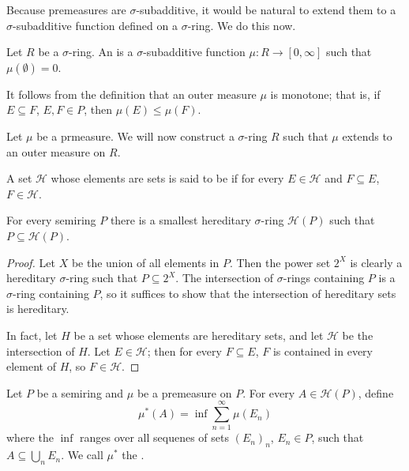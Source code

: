 \begin{subsec}
Because premeasures are $\sigma$-subadditive, it would be natural to extend them to a $\sigma$-subadditive function defined on a $\sigma$-ring. We do this now.
\end{subsec}

\begin{definition}
Let $R$ be a $\sigma$-ring.
An  is a $\sigma$-subadditive function $\mu: R \to [0, \infty]$ such that $\mu(\emptyset) = 0$.
\end{definition}

\begin{subsec}
It follows from the definition that an outer measure $\mu$ is monotone; that is, if $E \subseteq F$, $E,F \in P$, then $\mu(E) \leq \mu(F)$.
\end{subsec}

\begin{subsec}
Let $\mu$ be a prmeasure.
We will now construct a $\sigma$-ring $R$ such that $\mu$ extends to an outer measure on $R$.
\end{subsec}

\begin{definition}
A set $\mathcal H$ whose elements are sets is said to be  if for every $E \in \mathcal H$ and $F \subseteq E$, $F \in \mathcal H$.
\end{definition}

\begin{lemma}
For every semiring $P$ there is a smallest hereditary $\sigma$-ring $\mathcal H(P)$ such that $P \subseteq \mathcal H(P)$.
\end{lemma}
\begin{proof}
Let $X$ be the union of all elements in $P$. Then the power set $2^{X}$ is clearly a hereditary $\sigma$-ring such that $P \subseteq 2^{X}$.
The intersection of $\sigma$-rings containing $P$ is a $\sigma$-ring containing $P$, so it suffices to show that the intersection of hereditary sets is hereditary.

In fact, let $H$ be a set whose elements are hereditary sets, and let $\mathcal H$ be the intersection of $H$.
Let $E \in \mathcal H$; then for every $F \subseteq E$, $F$ is contained in every element of $H$, so $F \in \mathcal H$.
\end{proof}

\begin{definition}
Let $P$ be a semiring and $\mu$ be a premeasure on $P$. For every $A \in \mathcal H(P)$, define
\[\mu^{*}(A) = \inf \sum_{n=1}^{\infty} \mu(E_{n})\]
where the $\inf$ ranges over all sequenes of sets ${(E_{n})}_{n}$, $E_{n} \in P$, such that $A \subseteq \bigcup_{n} E_{n}$.
We call $\mu^{*}$ the .
\end{definition}

